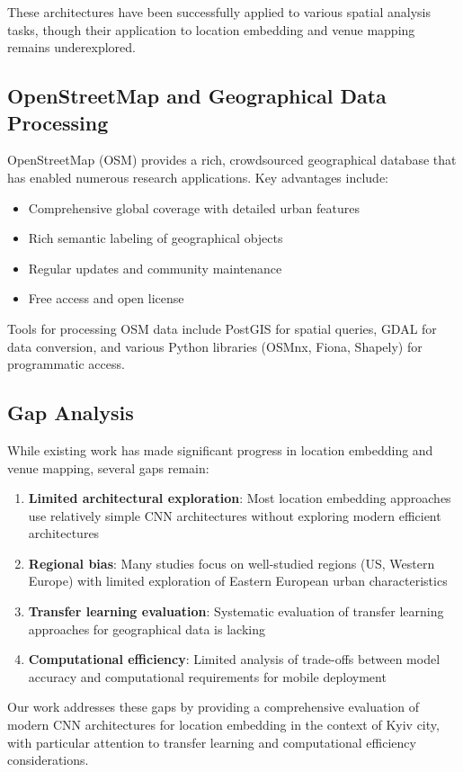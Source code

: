 These architectures have been successfully applied to various spatial analysis tasks, though their application to location embedding and venue mapping remains underexplored.

\subsection{OpenStreetMap and Geographical Data Processing}

OpenStreetMap (OSM) \cite{haklay2008openstreetmap} provides a rich, crowdsourced geographical database that has enabled numerous research applications. Key advantages include:
\begin{itemize}
    \item Comprehensive global coverage with detailed urban features
    \item Rich semantic labeling of geographical objects
    \item Regular updates and community maintenance
    \item Free access and open license
\end{itemize}

Tools for processing OSM data include PostGIS for spatial queries, GDAL for data conversion, and various Python libraries (OSMnx, Fiona, Shapely) for programmatic access.

\subsection{Gap Analysis}

While existing work has made significant progress in location embedding and venue mapping, several gaps remain:

\begin{enumerate}
    \item \textbf{Limited architectural exploration}: Most location embedding approaches use relatively simple CNN architectures without exploring modern efficient architectures
    \item \textbf{Regional bias}: Many studies focus on well-studied regions (US, Western Europe) with limited exploration of Eastern European urban characteristics
    \item \textbf{Transfer learning evaluation}: Systematic evaluation of transfer learning approaches for geographical data is lacking
    \item \textbf{Computational efficiency}: Limited analysis of trade-offs between model accuracy and computational requirements for mobile deployment
\end{enumerate}

Our work addresses these gaps by providing a comprehensive evaluation of modern CNN architectures for location embedding in the context of Kyiv city, with particular attention to transfer learning and computational efficiency considerations.
